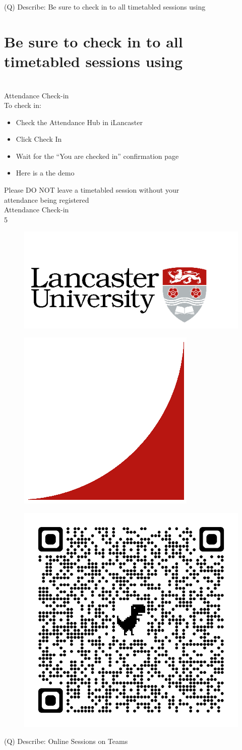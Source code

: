 \documentclass[12pt]{article}
\begin{document}
\clearpage
(Q)
Describe: Be sure to check in to all timetabled sessions using 
\clearpage
\section{Be sure to check in to all timetabled sessions using }
\\
Attendance Check-in\\
To check in:\\
\begin{itemize}
  \item Check the Attendance Hub in iLancaster
  \item Click Check In
  \item Wait for the “You are checked in” confirmation page
  \item Here is a the demo
\end{itemize}
Please DO NOT leave a timetabled session without your\\
attendance being registered\\
Attendance Check-in\\
5\\
\begin{figure}[H]
\includegraphics[width=0.5\linewidth]{page5-image-1.png}
\end{figure}
\begin{figure}[H]
\includegraphics[width=0.5\linewidth]{page5-image-2.png}
\end{figure}
\begin{figure}[H]
\includegraphics[width=0.5\linewidth]{page5-image-3.png}
\end{figure}
\clearpage
(Q)
Describe: Online Sessions on Teams
\clearpage
\end{document}
